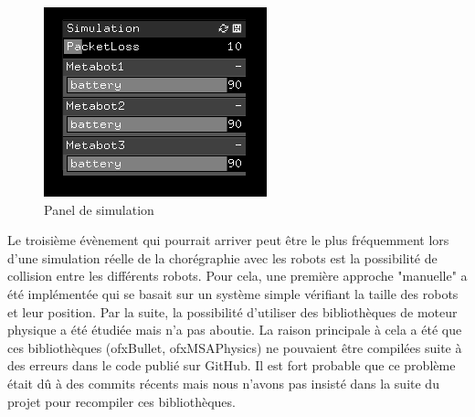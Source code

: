 \begin{figure}[H]
\centering
\includegraphics[scale=1]{imgs/spanel}
\caption{Panel de simulation}
\label{spa}
\end{figure} 

Le troisième évènement qui pourrait arriver peut être le plus fréquemment lors d'une simulation réelle de la chorégraphie avec les robots est la possibilité de collision entre les différents robots. Pour cela, une première approche "manuelle" a été implémentée qui se basait sur un système simple vérifiant la taille des robots et leur position. Par la suite, la possibilité d'utiliser des bibliothèques de moteur physique a été étudiée mais n'a pas aboutie. La raison principale à cela a été que ces bibliothèques (ofxBullet, ofxMSAPhysics) ne pouvaient être compilées suite à des erreurs dans le code publié sur GitHub. Il est fort probable que ce problème était dû à des commits récents mais nous n'avons pas insisté dans la suite du projet pour recompiler ces bibliothèques. 

